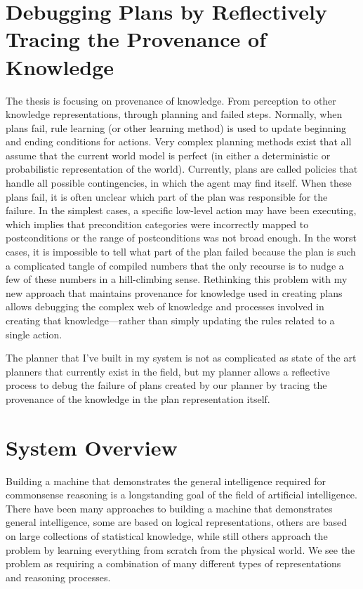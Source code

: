 \section{Debugging Plans by Reflectively Tracing the Provenance of Knowledge}

The thesis is focusing on provenance of knowledge.  From perception to
other knowledge representations, through planning and failed steps.
Normally, when plans fail, rule learning (or other learning method) is
used to update beginning and ending conditions for actions.  Very
complex planning methods exist that all assume that the current world
model is perfect (in either a deterministic or probabilistic
representation of the world).  Currently, plans are called policies
that handle all possible contingencies, in which the agent may find
itself.  When these plans fail, it is often unclear which part of the
plan was responsible for the failure.  In the simplest cases, a
specific low-level action may have been executing, which implies that
precondition categories were incorrectly mapped to postconditions or
the range of postconditions was not broad enough.  In the worst cases,
it is impossible to tell what part of the plan failed because the plan
is such a complicated tangle of compiled numbers that the only
recourse is to nudge a few of these numbers in a hill-climbing sense.
Rethinking this problem with my new approach that maintains provenance
for knowledge used in creating plans allows debugging the complex web
of knowledge and processes involved in creating that
knowledge---rather than simply updating the rules related to a single
action.

The planner that I've built in my system is not as complicated as
state of the art planners that currently exist in the field, but my
planner allows a reflective process to debug the failure of plans
created by our planner by tracing the provenance of the knowledge in
the plan representation itself.

\section{System Overview}

Building a machine that demonstrates the general intelligence required
for commonsense reasoning is a longstanding goal of the field of
artificial intelligence.  There have been many approaches to building
a machine that demonstrates general intelligence, some are based on
logical representations, others are based on large collections of
statistical knowledge, while still others approach the problem by
learning everything from scratch from the physical world.  We see the
problem as requiring a combination of many different types of
representations and reasoning processes.

